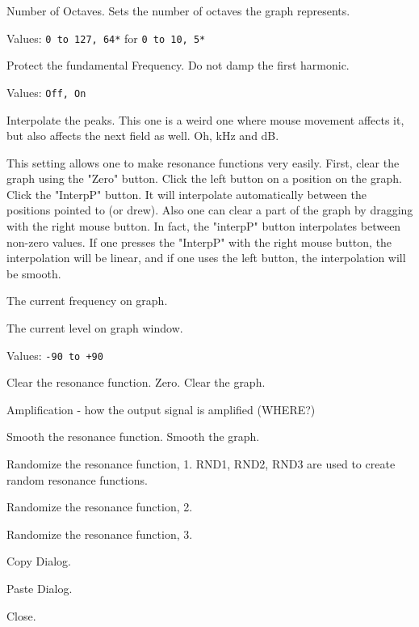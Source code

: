   Number of Octaves.
   Sets the number of octaves the graph represents.

   Values: \texttt{0 to 127, 64*} for \texttt{0 to 10, 5*}

   Protect the fundamental Frequency.
   Do not damp the first harmonic.

   Values: \texttt{Off, On}

   Interpolate the peaks.
   This one is a weird one where mouse movement affects it,
   but also affects the next field as well.  Oh, kHz and dB.

   This setting allows one to make resonance functions very easily. First,
   clear the graph using the "Zero" button. Click the left button on a
   position on the graph. Click the "InterpP" button. It will interpolate
   automatically between the positions pointed to (or drew).  Also one can
   clear a part of the graph by dragging with the right mouse button. In
   fact, the "interpP" button interpolates between non-zero values.  If one
   presses the "InterpP" with the right mouse button, the interpolation will
   be linear, and if one uses the left button, the interpolation will be
   smooth. 

   The current frequency on graph.

   The current level on graph window.

   Values: \texttt{-90 to +90}

   Clear the resonance function.
   Zero. Clear the graph.

   Amplification - how the output signal is amplified (WHERE?)

   Smooth the resonance function.
   Smooth the graph.

   Randomize the resonance function, 1.
   RND1, RND2, RND3 are used to create random resonance functions.

   Randomize the resonance function, 2.

   Randomize the resonance function, 3.

   Copy Dialog.

   Paste Dialog.

   Close.

